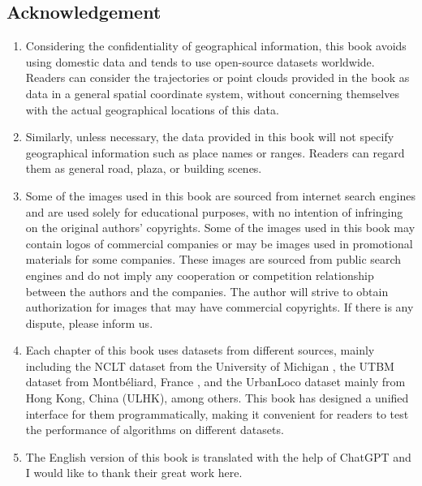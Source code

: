 \subsection*{Acknowledgement}
\begin{enumerate}
	\item Considering the confidentiality of geographical information, this book avoids using domestic data and tends to use open-source datasets worldwide. Readers can consider the trajectories or point clouds provided in the book as data in a general spatial coordinate system, without concerning themselves with the actual geographical locations of this data.
	\item Similarly, unless necessary, the data provided in this book will not specify geographical information such as place names or ranges. Readers can regard them as general road, plaza, or building scenes.
	\item Some of the images used in this book are sourced from internet search engines and are used solely for educational purposes, with no intention of infringing on the original authors' copyrights. Some of the images used in this book may contain logos of commercial companies or may be images used in promotional materials for some companies. These images are sourced from public search engines and do not imply any cooperation or competition relationship between the authors and the companies. The author will strive to obtain authorization for images that may have commercial copyrights. If there is any dispute, please inform us.
	\item Each chapter of this book uses datasets from different sources, mainly including the NCLT dataset from the University of Michigan \cite{CarlevarisBianco2015}, the UTBM dataset from Montbéliard, France \cite{Yan2020}, and the UrbanLoco dataset mainly from Hong Kong, China \cite{Wen2020} (ULHK), among others. This book has designed a unified interface for them programmatically, making it convenient for readers to test the performance of algorithms on different datasets.
	\item The English version of this book is translated with the help of ChatGPT and I would like to thank their great work here.
\end{enumerate}
